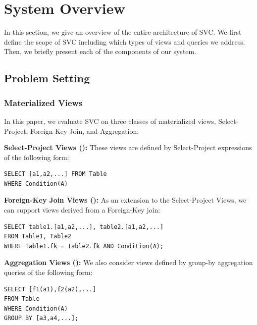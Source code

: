\section{System Overview}\label{sec-arch}
In this section, we give an overview of the entire architecture of SVC.
We first define the scope of SVC including which types of views and queries we address.
Then, we briefly present each of the components of our system.

\subsection{Problem Setting}
\vspace{-.5em}
\subsubsection{Materialized Views}
In this paper, we evaluate SVC on three classes of materialized views, Select-Project, Foreign-Key Join, and Aggregation:
\vspace{0.25em}

\noindent\textbf{Select-Project Views (\spview): } These views are defined by Select-Project
expressions of the following form:

\begin{lstlisting}
SELECT [a1,a2,...] FROM Table 
WHERE Condition(A) 
\end{lstlisting}

\vspace{0.25em}

\noindent\textbf{Foreign-Key Join Views (\fjview): } As an extension to the Select-Project Views, we can support views derived from a Foreign-Key join:

\begin{lstlisting}
SELECT table1.[a1,a2,...], table2.[a1,a2,...] 
FROM Table1, Table2 
WHERE Table1.fk = Table2.fk AND Condition(A);
\end{lstlisting}

\vspace{0.25em}

\noindent\textbf{Aggregation Views (\aggview): } We also consider views defined by group-by aggregation queries of the following form:

\begin{lstlisting}
SELECT [f1(a1),f2(a2),...] 
FROM Table 
WHERE Condition(A)
GROUP BY [a3,a4,...];
\end{lstlisting}

